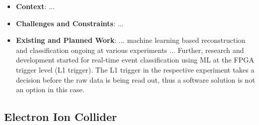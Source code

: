 \begin{itemize}
    \item \textbf{Context}: ...
    \item \textbf{Challenges and Constraints}: ...
    \item \textbf{Existing and Planned Work}: ... machine learning based reconstruction and classification ongoing at various experiments \cite{}... Further, research and development started for real-time event classification using ML at the FPGA trigger level (L1 trigger). The L1 trigger in the respective experiment takes a decision before the raw data is being read out, thus a software solution is not an option in this case.
\end{itemize}





\subsection{Electron Ion Collider}

